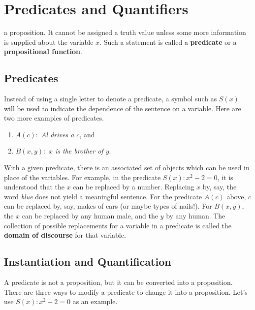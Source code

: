 \chapter{Predicates and Quantifiers}


 a proposition. It cannot be assigned a truth
value unless some more information is supplied about the variable $x$.
Such a statement is called a  {\bfseries predicate} or a {\bfseries propositional
function}.  

\section{Predicates}
Instead of using a single letter to denote
a predicate, a symbol such as $S(x)$ will be used to indicate the dependence of the sentence on a 
variable. Here are two more examples of
predicates. 
\begin{enumerate}
\item $A(c) : $ {\itshape Al drives a $c$}, and 
\item $B(x,y) :$ {\itshape $x$ is the brother of $y$}.
\end{enumerate}
With a given predicate, there is an associated set of objects which can be
used in place of the variables. For example, in the predicate $S(x) : x^2-2=0$, 
it is understood that the $x$ can be replaced by a number. Replacing $x$ by, say, the
word {\itshape blue} does not yield a meaningful sentence. For the predicate
$A(c)$ above, $c$ can be replaced %
%
 by, say, makes of cars (or maybe types of nails!).
 For $B(x,y)$, the $x$ can be replaced by any human male, and the $y$ by any human. 
The collection of possible replacements for a variable in a predicate is called the 
{\bfseries domain of discourse} for that variable.

\section{Instantiation and Quantification}
A predicate is not a proposition, but it can be converted into a proposition. There
are three ways to modify a predicate to change it into a proposition. Let's use
$S(x) : x^2-2=0$ as an example.

